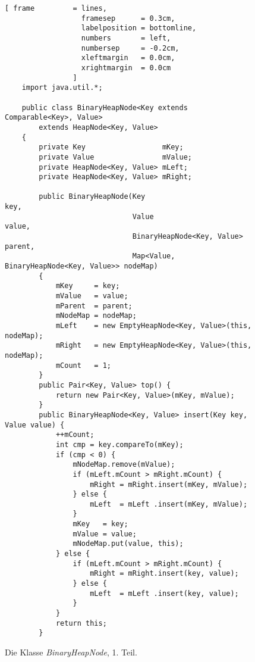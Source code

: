 \begin{figure}[!ht]
  \centering
\begin{Verbatim}[ frame         = lines, 
                  framesep      = 0.3cm, 
                  labelposition = bottomline,
                  numbers       = left,
                  numbersep     = -0.2cm,
                  xleftmargin   = 0.0cm,
                  xrightmargin  = 0.0cm
                ]
    import java.util.*;
    
    public class BinaryHeapNode<Key extends Comparable<Key>, Value> 
        extends HeapNode<Key, Value>
    {
        private Key                  mKey;
        private Value                mValue;
        private HeapNode<Key, Value> mLeft;
        private HeapNode<Key, Value> mRight;
    
        public BinaryHeapNode(Key                                    key, 
                              Value                                  value, 
                              BinaryHeapNode<Key, Value>             parent,
                              Map<Value, BinaryHeapNode<Key, Value>> nodeMap)
        {
            mKey     = key;
            mValue   = value;
            mParent  = parent;
            mNodeMap = nodeMap;
            mLeft    = new EmptyHeapNode<Key, Value>(this, nodeMap);
            mRight   = new EmptyHeapNode<Key, Value>(this, nodeMap);
            mCount   = 1;
        }
        public Pair<Key, Value> top() {
            return new Pair<Key, Value>(mKey, mValue);
        }
        public BinaryHeapNode<Key, Value> insert(Key key, Value value) {
            ++mCount;
            int cmp = key.compareTo(mKey);
            if (cmp < 0) {
                mNodeMap.remove(mValue);
                if (mLeft.mCount > mRight.mCount) {
                    mRight = mRight.insert(mKey, mValue);
                } else {
                    mLeft  = mLeft .insert(mKey, mValue);
                }
                mKey   = key;
                mValue = value;
                mNodeMap.put(value, this);
            } else {
                if (mLeft.mCount > mRight.mCount) {
                    mRight = mRight.insert(key, value);
                } else {
                    mLeft  = mLeft .insert(key, value);
                }
            }
            return this;
        }
\end{Verbatim}
\vspace*{-0.3cm}
  \caption{Die Klasse  \textsl{BinaryHeapNode}, 1. Teil.}
  \label{fig:BinaryHeapNode-2-I}
\end{figure}


